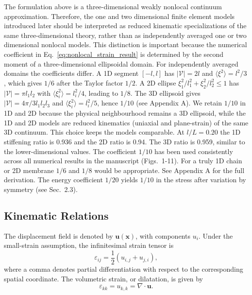 \documentclass[final,3p,times,fleqn]{elsarticle}
\newcommand{\rev}[1]{\textcolor{revcolor}{#1}}
\begin{document}
The formulation above is a three-dimensional weakly nonlocal continuum
approximation. Therefore, the one and two dimensional finite element
models introduced later should be interpreted as reduced kinematic
specializations of the same three-dimensional theory, rather than as
independently averaged one  or two dimensional nonlocal models. This
distinction is important because the numerical coefficient in
Eq.~\eqref{eq:nonlocal_strain_result} is determined by the second
moment of a three-dimensional ellipsoidal domain.
\rev{For independently averaged domains the coefficients differ. A 1D segment $[-l,l]$ has $|\mathcal{V}|=2l$ and $\langle\xi^2\rangle=l^2/3$, which gives $1/6$ after the Taylor factor $1/2$. A 2D ellipse $\xi_1^2/l_1^2+\xi_2^2/l_2^2\le1$ has $|\mathcal{V}|=\pi l_1l_2$ with $\langle\xi_i^2\rangle=l_i^2/4$, leading to $1/8$. The 3D ellipsoid gives $|\mathcal{V}|=4\pi/3 l_1l_2l_3$ and $\langle\xi_i^2\rangle=l_i^2/5$, hence $1/10$ (see Appendix A). We retain $1/10$ in 1D and 2D because the physical neighbourhood remains a 3D ellipsoid, while the 1D and 2D models are reduced kinematics (uniaxial and plane-strain) of the same 3D continuum. This choice keeps the models comparable. At $l/L=0.20$ the 1D stiffening ratio is 0.936 and the 2D ratio is 0.94. The 3D ratio is 0.959, similar to the lower-dimensional values. The coefficient $1/10$ has been used consistently across all numerical results in the manuscript (Figs.~1-11). For a truly 1D chain or 2D membrane $1/6$ and $1/8$ would be appropriate. See Appendix A for the full derivation. The energy coefficient $1/20$ yields $1/10$ in the stress after variation by symmetry (see Sec.~2.3).}

\subsection{Kinematic Relations}

The displacement field is denoted by $\mathbf{u}(\mathbf{x})$, with
components $u_i$. Under the small-strain assumption, the infinitesimal
strain tensor is
\begin{equation}\label{eq:kinematic}
\varepsilon_{ij}
=
\frac{1}{2}\left(u_{i,j}+u_{j,i}\right),
\end{equation}
where a comma denotes partial differentiation with respect to the
corresponding spatial coordinate. The volumetric strain, or dilatation,
is given by
\begin{equation}\label{eq:dilatation}
\varepsilon_{kk}
=
u_{k,k}
=
\nabla\cdot\mathbf{u}.
\end{equation}
\end{document}
